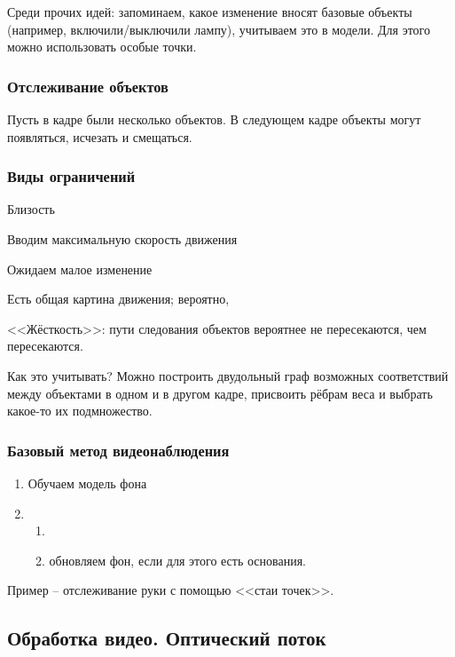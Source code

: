 \documentclass[main.tex]{subfiles}
\begin{document}
Среди прочих идей: запоминаем, какое изменение вносят базовые объекты (например, включили/выключили лампу), учитываем это в модели.
Для этого можно использовать особые точки.

\subsubsection{Отслеживание объектов}

Пусть в кадре были несколько объектов.
В следующем кадре объекты могут появляться, исчезать и смещаться.


\subsubsection{Виды ограничений}

Близость

Вводим максимальную скорость движения

Ожидаем малое изменение

Есть общая картина движения; вероятно,

<<Жёсткость>>: пути следования объектов вероятнее не пересекаются, чем пересекаются.

Как это учитывать?
Можно построить двудольный граф возможных соответствий между объектами в одном и в другом кадре, присвоить рёбрам веса и выбрать какое-то их подмножество.

\subsubsection{Базовый метод видеонаблюдения}

\begin{enumerate}[noitemsep]
    \item Обучаем модель фона
    \item %
    \begin{enumerate}[noitemsep]
        \item %
        \item обновляем фон, если для этого есть основания.
    \end{enumerate}
\end{enumerate}

Пример -- отслеживание руки с помощью <<стаи точек>>.

\subsection{Обработка видео. Оптический поток}
\end{document}
